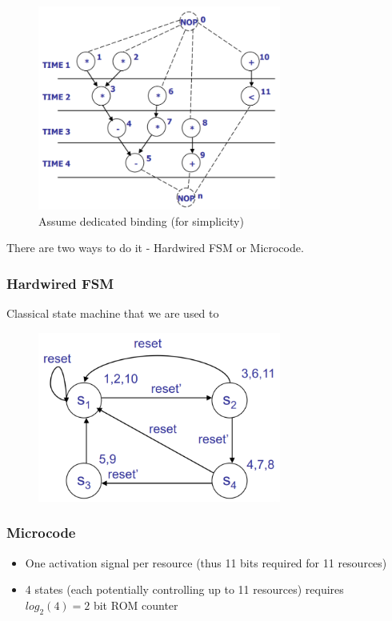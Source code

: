\documentclass{article}
\begin{document}
\begin{figure}[htp]
    \centering
    \includegraphics[width=8cm, scale=1]{S3/controlPathSynthesis1.PNG}
    \caption{Assume dedicated binding (for simplicity)}
\end{figure}

There are two ways to do it - Hardwired FSM or Microcode.

\newpage
\subsubsection{Hardwired FSM}
Classical state machine that we are used to

\begin{figure}[htp]
    \centering
    \includegraphics[width=8cm, scale=1]{S3/hardwiredFSM.PNG}
\end{figure}

\subsubsection{Microcode}

\begin{itemize}
    \item One activation signal per resource (thus 11 bits required for 11 resources)
    \item 4 states (each potentially controlling up to 11 resources) requires $log_{2}(4) = 2$ bit ROM counter
\end{itemize}
\end{document}
